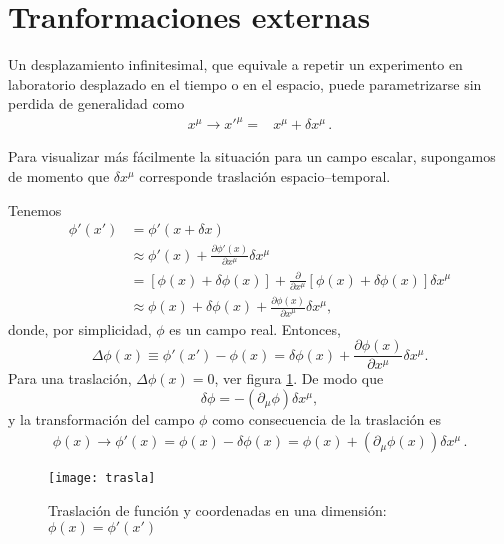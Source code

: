 \section{Tranformaciones externas}
\label{sec:tranf-extern}
\begin{frame}
Un desplazamiento infinitesimal, que equivale a repetir un experimento en laboratorio desplazado en el tiempo o en el espacio,
puede parametrizarse sin perdida de generalidad como
\begin{align}
  x^\mu\to{x'}^\mu=&x^\mu+\delta x^{\mu}\,.
\end{align}

Para visualizar más fácilmente la situación para un campo escalar, supongamos de momento que $\delta x^{\mu}$ corresponde  traslación espacio--temporal.

Tenemos
\begin{align}
  \phi'(x')&=\phi'(x+\delta x)\\
  &\approx\phi'(x)+\frac{\partial\phi'(x)}{\partial x^\mu}\delta x^\mu\\
  &=[\phi(x)+\delta\phi(x)]+\frac{\partial}{\partial x^\mu}[\phi(x)+\delta\phi(x)]\delta x^\mu\\
  &\approx\phi(x)+\delta\phi(x)+\frac{\partial\phi(x)}{\partial x^\mu}\delta x^\mu,
\end{align}
donde, por simplicidad, $\phi$ es un campo real. Entonces,
\begin{equation}
  \label{eq:Deltaf}
  \Delta\phi(x)\equiv\phi'(x')-\phi(x)=\delta\phi(x)+\frac{\partial\phi(x)}{\partial x^\mu}\delta x^\mu.
\end{equation}
Para una traslación, $\Delta\phi(x)=0$, ver figura 
\ref{fig:trasla}. %
De modo que
\begin{equation}
  \label{eq:dmuxmu}
  \delta\phi=-(\partial_\mu\phi)\delta x^\mu,
\end{equation}
y la transformación del campo $\phi$ como consecuencia de la traslación es
\begin{align}
  \phi(x)\to\phi'(x)=\phi(x)-\delta\phi(x)=\phi(x)+(\partial_\mu\phi(x))\delta x^\mu\,.
\end{align}

\begin{figure} %
  \centering %
  \texttt{[image: trasla]} %
  \caption{Traslación de función y coordenadas en una dimensión: $\phi(x)=\phi'(x')$ } %
  \label{fig:trasla} %
\end{figure} %

\end{frame}




